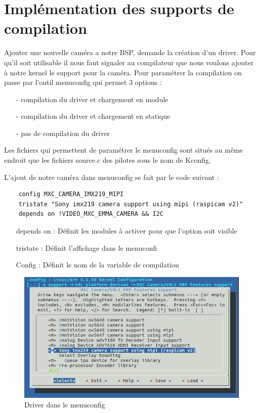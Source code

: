 \section{Implémentation des supports de compilation}

Ajouter une nouvelle caméra a notre BSP, demande la création d’un driver. Pour qu’il soit
utilisable il nous faut signaler au compilateur que nous voulons ajouter à notre kernel le
support pour la caméra. Pour paramétrer la compilation on passe par l’outil menuconfig
qui permet 3 options :

\begin{itemize}
    \item[-] compilation du driver et chargement en module
    \item[-] compilation du driver et chargement en statique
    \item[-] pas de compilation du driver
\end{itemize}

Les fichiers qui permettent de paramétrer le menuconfig sont situés au même endroit que
les fichiers source.c des pilotes sous le nom de Kconfig.

L’ajout de notre caméra dans menuconfig se fait par le code suivant :

\begin{lstlisting}
    config MXC_CAMERA_IMX219_MIPI
    tristate "Sony imx219 camera support using mipi (raspicam v2)"
    depends on !VIDEO_MXC_EMMA_CAMERA && I2C
\end{lstlisting}

\begin{itemize}
    \item[depends on : ] Définit les modules à activer pour que l’option soit visible
    \item[tristate : ] Définit l’affichage dans le menuconfi
    \item[Config : ] Définit le nom de la variable de compilation
\end{itemize}

\begin{figure}[!htb]
    \centering
    \includegraphics[trim={0cm 0cm 0cm 0cm},clip,scale=0.1]{Figures/menuconfig.png}
    \decoRule
    \caption{Driver dans le menuconfig} \label{fig:menucfg}
\end{figure}

